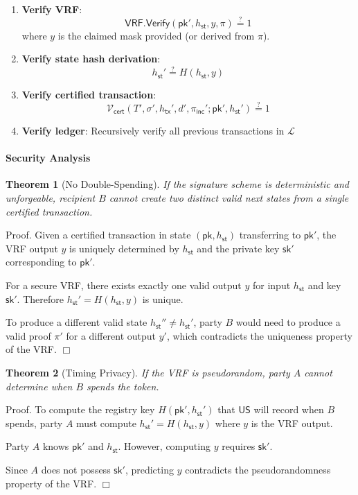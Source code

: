 \documentclass{article}
\newtheorem{theorem}{Theorem}[section]
\newenvironment{proof}{\textsf{Proof}.}{\hfill$\Box$}
\newcommand{\pubkey}[0]{\mathsf{pk}}
\newcommand{\prikey}[0]{\mathsf{sk}}
\newcommand{\unisrv}[0]{\mathsf{US}}
\newcommand{\sthash}[0]{{h_\mathsf{st}}}
\newcommand{\txhash}[0]{{h_\mathsf{tx}}}
\newcommand{\certver}[0]{{\mathcal{V}_\mathsf{cert}}}
\newcommand{\pinc}[0]{{\pi_{\mathsf{inc}}}}
\begin{document}
\begin{enumerate}
\item \textbf{Verify VRF}:
\[
\mathsf{VRF.Verify}(\pubkey', \sthash, y, \pi) \stackrel{?}{=} 1
\]
where $y$ is the claimed mask provided (or derived from $\pi$).

\item \textbf{Verify state hash derivation}:
\[
\sthash' \stackrel{?}{=} H(\sthash, y)
\]

\item \textbf{Verify certified transaction}:
\[
\certver(T', \sigma', \txhash', d', \pinc'; \pubkey', \sthash') \stackrel{?}{=} 1
\]

\item \textbf{Verify ledger}: Recursively verify all previous transactions in $\mathcal{L}$
\end{enumerate}

\paragraph{Security Analysis}

\begin{theorem}[No Double-Spending]
If the signature scheme is deterministic and unforgeable, recipient $B$ cannot create two distinct valid next states from a single certified transaction.
\end{theorem}

\begin{proof}
Given a certified transaction in state $(\pubkey, \sthash)$ transferring to $\pubkey'$, the VRF output $y$ is uniquely determined by $\sthash$ and the private key $\prikey'$ corresponding to $\pubkey'$.

For a secure VRF, there exists exactly one valid output $y$ for input $\sthash$ and key $\prikey'$. Therefore $\sthash' = H(\sthash, y)$ is unique.

To produce a different valid state $\sthash'' \neq \sthash'$, party $B$ would need to produce a valid proof $\pi'$ for a different output $y'$, which contradicts the uniqueness property of the VRF.
\end{proof}

\begin{theorem}[Timing Privacy]
If the VRF is pseudorandom, party $A$ cannot determine when $B$ spends the token.
\end{theorem}

\begin{proof}
To compute the registry key $H(\pubkey', \sthash')$ that $\unisrv$ will record when $B$ spends, party $A$ must compute $\sthash' = H(\sthash, y)$ where $y$ is the VRF output.

Party $A$ knows $\pubkey'$ and $\sthash$. However, computing $y$ requires $\prikey'$.

Since $A$ does not possess $\prikey'$, predicting $y$ contradicts the pseudorandomness property of the VRF.
\end{proof}
\end{document}
